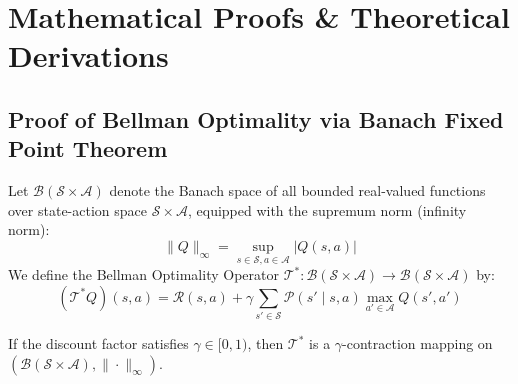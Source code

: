 \chapter{Mathematical Proofs \& Theoretical Derivations}
\label{app:proofs}

\section{Proof of Bellman Optimality via Banach Fixed Point Theorem}
Let $\mathcal{B}(\mathcal{S} \times \mathcal{A})$ denote the Banach space of all bounded real-valued functions over state-action space $\mathcal{S} \times \mathcal{A}$, equipped with the supremum norm (infinity norm):
\begin{equation}
    \|Q\|_\infty = \sup_{s \in \mathcal{S}, a \in \mathcal{A}} |Q(s, a)|
\end{equation}
We define the Bellman Optimality Operator $\mathcal{T}^*: \mathcal{B}(\mathcal{S} \times \mathcal{A}) \to \mathcal{B}(\mathcal{S} \times \mathcal{A})$ by:
\begin{equation}
    (\mathcal{T}^* Q)(s, a) = \mathcal{R}(s, a) + \gamma \sum_{s' \in \mathcal{S}} \mathcal{P}(s' \mid s, a) \max_{a' \in \mathcal{A}} Q(s', a')
\end{equation}

\begin{theorem}
If the discount factor satisfies $\gamma \in [0, 1)$, then $\mathcal{T}^*$ is a $\gamma$-contraction mapping on $(\mathcal{B}(\mathcal{S} \times \mathcal{A}), \|\cdot\|_\infty)$.
\end{theorem}

